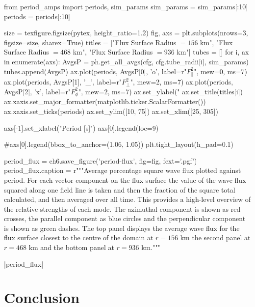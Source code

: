 \begin{pycode}[chapter6]
from period_amps import periods, sim_params
sim_params = sim_params[:10]
periods = periods[:10]

size = texfigure.figsize(pytex, height_ratio=1.2)
fig, axs = plt.subplots(nrows=3, figsize=size, sharex=True)
titles = ["Flux Surface Radius $=156$ km", "Flux Surface Radius $=468$ km", "Flux Surface Radius $=936$ km"]
tubes = []
for i, ax in enumerate(axs):
    AvgsP = ph.get_all_avgs(cfg, cfg.tube_radii[i], sim_params)
    tubes.append(AvgsP)
    ax.plot(periods, AvgsP[0], 'o', label=r"$F_\parallel^2$", mew=0, ms=7)
    ax.plot(periods, AvgsP[1], '_', label=r"$F_\perp^2$", mew=2, ms=7)
    ax.plot(periods, AvgsP[2], 'x', label=r"$F_\phi^2$", mew=2, ms=7)
    ax.set_ylabel("%
    ax.set_title(titles[i])
    ax.xaxis.set_major_formatter(matplotlib.ticker.ScalarFormatter())
    ax.xaxis.set_ticks(periods)
    ax.set_ylim([10, 75])
    ax.set_xlim([25, 305])

axs[-1].set_xlabel("Period [s]")
axs[0].legend(loc=9)

#axs[0].legend(bbox_to_anchor=(1.06, 1.05))
plt.tight_layout(h_pad=0.1)

period_flux = ch6.save_figure('period-flux', fig=fig, fext='.pgf')
period_flux.caption = r"""Average percentage square wave flux plotted against period. For each vector component on the flux surface the value of the wave flux squared along one field line is taken and then the fraction of the square total calculated, and then averaged over all time. This provides a high-level overview of the relative strengths of each mode. The azimuthal component is shown as red crosses, the parallel component as blue circles and the perpendicular component is shown as green dashes. The top panel displays the average wave flux for the flux surface closest to the centre of the domain at $r=156$ km the second panel at $r=468$ km and the bottom panel at $r=936$ km."""

\end{pycode}

\py[chapter6]|period_flux|

\section{Conclusion}\label{sec:conclusion}

